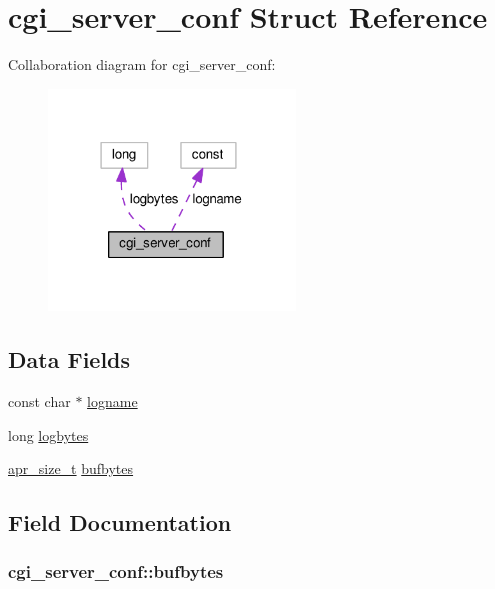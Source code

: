 \hypertarget{structcgi__server__conf}{}\section{cgi\+\_\+server\+\_\+conf Struct Reference}
\label{structcgi__server__conf}


Collaboration diagram for cgi\+\_\+server\+\_\+conf\+:
\nopagebreak
\begin{figure}[H]
\begin{center}
\leavevmode
\includegraphics[width=186pt]{structcgi__server__conf__coll__graph}
\end{center}
\end{figure}
\subsection*{Data Fields}
\begin{DoxyCompactItemize}
\item 
const char $\ast$ \hyperlink{structcgi__server__conf_aa630eeacabd08141502fe559788c4e86}{logname}
\item 
long \hyperlink{structcgi__server__conf_ab6bb27222e321572e607337b19e138e4}{logbytes}
\item 
\hyperlink{group__apr__platform_gaaa72b2253f6f3032cefea5712a27540e}{apr\+\_\+size\+\_\+t} \hyperlink{structcgi__server__conf_a1421689ccb8f0b6820bee584043647b4}{bufbytes}
\end{DoxyCompactItemize}


\subsection{Field Documentation}
\subsubsection[{\texorpdfstring{bufbytes}{bufbytes}}]{ cgi\+\_\+server\+\_\+conf\+::bufbytes}\hypertarget{structcgi__server__conf_a1421689ccb8f0b6820bee584043647b4}{}\label{structcgi__server__conf_a1421689ccb8f0b6820bee584043647b4}
